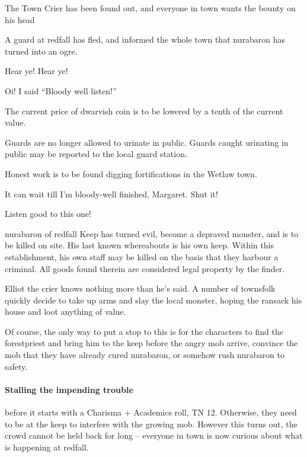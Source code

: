 \begin{multicols}{2}
{\N \N The Town Crier}%
{ has been found out, and everyone in town wants the bounty on his head}%

A guard at \gls{redfall} has fled, and informed the whole town that \gls{nurabaron} has turned into an ogre.

\begin{speechtext}

		Hear ye! Hear ye!

		Oi! I said ``Bloody well listen!''

		The current price of dwarvish coin is to be lowered by a tenth of the current value.

		Guards are no longer allowed to urinate in public.
		Guards caught urinating in public may be reported to the local guard station.

		Honest work is to be found digging fortifications in the Wetlaw town.

		It can wait till I'm bloody-well finished, Margaret.  Shut it!

		Listen good to this one!

		\gls{nurabaron} of \gls{redfall} Keep has turned evil, become a depraved monster, and is to be killed on site.  His last known whereabouts is his own keep.  Within this establishment, his own staff may be killed on the basis that they harbour a criminal.  All goods found therein are considered legal property by the finder.

\end{speechtext}

Elliot the crier knows nothing more than he's said.  A number of townsfolk quickly decide to take up arms and slay the local monster, hoping the ransack his house and loot anything of value.

Of course, the only way to put a stop to this is for the characters to find the \gls{forestpriest} and bring him to the keep before the angry mob arrive, convince the mob that they have already cured \gls{nurabaron}, or somehow rush \gls{nurabaron} to safety.

\paragraph{Stalling the impending trouble}
before it starts with a Charisma + Academics roll, TN 12.
Otherwise, they need to be at the keep to interfere with the growing mob.
However this turns out, the crowd cannot be held back for long -- everyone in town is now curious about what is happening at \gls{redfall}.


\end{multicols}
